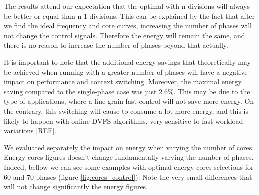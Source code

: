 The results attend our expectation that the optimal with n divisions will always be better or equal than n-1 divisions. This can be explained by the fact that after we find the ideal frequency and core curves, increasing the number of phases will not change the control signals. Therefore the energy will remain the same, and there is no reason to increase the number of phases beyond that actually. 

It is important to note that the additional energy savings that theoretically may be achieved when running with a greater number of phases will have a negative impact on performance and context switching. Moreover, the maximal energy saving compared to the single-phase case was just 2.6\%. This may be due to the type of applications, where a fine-grain fast control will not save more energy. On the contrary, this switching will cause to consume a lot more energy, and this is likely to happen with online DVFS algorithms, very sensitive to fast workload variations [REF].

We evaluated separately the impact on energy when varying the number of cores. Energy-cores figures doesn't change fundamentally varying the number of phases. Indeed, bellow we can see some examples with optimal energy cores selections for 60 and 70 phases (figure \ref{fig:cores_control}). Note the very small differences that will not change significantly the energy figures.


